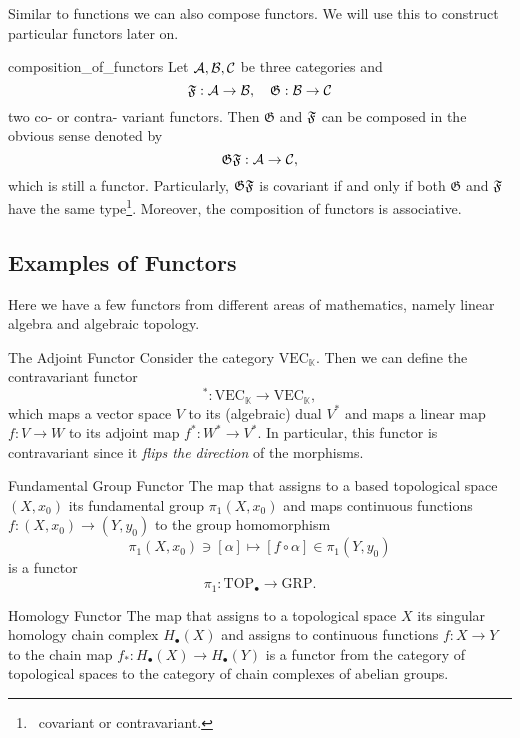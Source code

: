 Similar to functions we can also compose functors. We will use this to construct particular functors later on.

\begin{defprop}{\cite[Sec.~1.3.1]{Roman2017}}{composition_of_functors}
Let $\mathcal{A}, \mathcal{B}, \mathcal{C}$ be three categories and
$$
\mathfrak{F}: \mathcal{A} \to \mathcal{B}, \quad \mathfrak{G}: \mathcal{B} \to \mathcal{C}
$$
two co- or contra- variant functors. Then $\mathfrak{G}$ and $\mathfrak{F}$ can be composed in the obvious sense denoted by
$$
\mathfrak{G} \mathfrak{F}: \mathcal{A} \to \mathcal{C},
$$
which is still a functor. Particularly, $\mathfrak{G} \mathfrak{F}$ is covariant if and only if both $\mathfrak{G}$ and $\mathfrak{F}$ have the same type\footnote{\Ie\ covariant or contravariant.}. Moreover, the composition of functors is associative.
\end{defprop}

\subsection{Examples of Functors}

Here we have a few functors from different areas of mathematics, namely linear algebra and algebraic topology.

\begin{example}{The Adjoint Functor \cite[Ex.~1.2.12]{Leinster2014-dc}}{}
Consider the category $\mathrm{VEC}_\mathbb{K}$. Then we can define the contravariant functor
$$
^* : \mathrm{VEC}_\mathbb{K} \to \mathrm{VEC}_\mathbb{K},
$$
which maps a vector space $V$ to its (algebraic) dual $V^*$ and maps a linear map $f: V \to W$ to its adjoint map $f^*: W^* \to V^*$. In particular, this functor is contravariant since it \emph{flips the direction} of the morphisms.
\end{example}

\begin{example}{Fundamental Group Functor \cite[Ex.~1.2.5]{Leinster2014-dc}}{}
The map that assigns to a based topological space $(X,x_0)$ its fundamental group $\pi_1(X,x_0)$ and maps continuous functions $f: (X,x_0) \to (Y,y_0)$ to the group homomorphism 
$$
\pi_1(X,x_0) \ni [\alpha] \mapsto [f \circ \alpha] \in \pi_1(Y,y_0)
$$
is a functor
$$
\pi_1: \mathrm{TOP}_\bullet \to \mathrm{GRP}.
$$
\end{example}

\begin{example}{Homology Functor \cite[Chap.~2.3]{Hatcher2001}}{}
The map that assigns to a topological space $X$ its singular homology chain complex $H_\bullet(X)$ and assigns to continuous functions $f: X \to Y$ to the chain map ${f_*: H_\bullet(X) \to H_\bullet(Y)}$ is a functor from the category of topological spaces to the category of chain complexes of abelian groups.
\end{example}

